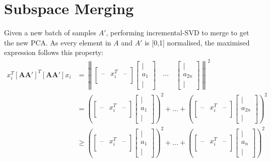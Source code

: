 \section{Subspace Merging}
Given a new batch of samples $A'$, performing incremental-SVD to merge to get
the new PCA. As every element in $A$ and $A'$ is [0,1] normalised, the maximised
expression follows this property:
\begin{align}
x_i^T \mathbf{[AA']}^T \mathbf{[AA']} x_i &= \left\| \begin{bmatrix}
\text{--} & x_i^T & \text{--} \\
\end{bmatrix}
\begin{bmatrix}
| \\
a_1 \\
|
\end{bmatrix} \quad \cdots \quad
\begin{bmatrix}
| \\
a_{2n} \\
|
\end{bmatrix} \right\|^2 \\
&= \left( \begin{bmatrix}
\text{--} & x_i^T & \text{--} \\
\end{bmatrix}
\begin{bmatrix}
| \\
a_1 \\
|
\end{bmatrix} \right)^2 +  \dots + \left( \begin{bmatrix}
\text{--} & x_i^T & \text{--} \\
\end{bmatrix}
\begin{bmatrix}
| \\
a_{2n} \\
|
\end{bmatrix} \right)^2 \\
&\geq \left( \begin{bmatrix}
\text{--} & x_i^T & \text{--} \\
\end{bmatrix}
\begin{bmatrix}
| \\
a_1 \\
|
\end{bmatrix} \right)^2 + \dots + \left( \begin{bmatrix}
\text{--} & x_i^T & \text{--} \\
\end{bmatrix}
\begin{bmatrix}
| \\
a_{n} \\
|
\end{bmatrix} \right)^2
\end{align}

